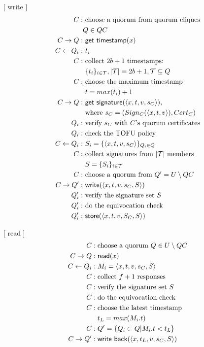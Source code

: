 [ {\sf write} ]
\begin{align*}
  C :& \text{ choose a quorum from quorum cliques} \\
     & Q \in QC \\
  C \rightarrow Q :& \text{ \sf get timestamp}(x) \\
  C \leftarrow Q_i :& \text{ } t_i \\
  C :& \text{ collect } 2b+1 \text{ timestamps: } \\
     & \text{ } \{t_i\}_{i \in \mathcal{T}}, |\mathcal{T}|=2b+1,
       \mathcal{T} \subseteq Q \\
  C :& \text{ choose the maximum timestamp } \\
     & \text{ } t = max(t_i) + 1 \\
  C \rightarrow Q :& \text{ \sf get signature}(\langle x, t, v, s_C \rangle),\\
     & \text{ where } s_C = (Sign_C(\langle x, t, v \rangle), Cert_C) \\
  Q_i :& \text{ verify $s_C$ with $C$'s quorum certificates} \\
  Q_i :& \text{ check the TOFU policy} \\
  C \leftarrow Q_i :& \text{ } S_i = \{\langle x, t, v, s_C
  \rangle\}_{Q_i \in Q} \\
  C :& \text{ collect signatures from $|\mathcal{T}|$ members} \\
     & \text{ } S = \{S_i\}_{i \in \mathcal{T}} \\
  C :& \text{ choose a quorum from } Q' = U \setminus QC \\
  C \rightarrow Q' :& \text{ \sf write}(\langle x, t, v, s_C, S \rangle) \\
  Q'_i :& \text{ verify the signature set $S$} \\
  Q'_i :& \text{ do the equivocation check} \\
  Q'_i :& \text{ \sf store}(\langle x, t, v, S_C, S \rangle)
\end{align*}

[ {\sf read} ]
\setcounter{equation}{0}
\begin{align*}
  C :&\; \text{choose a quorum } Q \in U \setminus QC \\
  C \rightarrow Q :&\; \text{\sf read}(x) \\
  C \leftarrow Q_i :&\; M_i = \langle x, t, v, s_C, S \rangle \\
  C :&\; \text{collect } f + 1 \text{ responses} \\
  C :&\; \text{verify the signature set $S$} \\
  C :&\; \text{do the equivocation check} \\
  C :&\; \text{choose the latest timestamp } \\
     &\; t_L = max(M_i.t) \\
  C :&\; Q' = \{Q_i \subset Q | M_i.t < t_L\} \\
  C \rightarrow Q' :&\; \text{\sf write back}(\langle x, t_L, v, s_C, S \rangle)
\end{align*}


